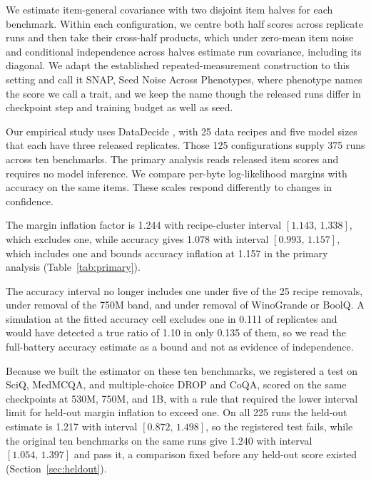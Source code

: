 \documentclass{article}
\newcommand{\ci}[2]{\ensuremath{[#1,\,#2]}}
\begin{document}
We estimate item-general covariance with two disjoint item halves for each benchmark. Within each configuration, we centre both half scores across replicate runs and then take their cross-half products, which under zero-mean item noise and conditional independence across halves estimate run covariance, including its diagonal. We adapt the established repeated-measurement construction to this setting and call it SNAP, Seed Noise Across Phenotypes, where phenotype names the score we call a trait, and we keep the name though the released runs differ in checkpoint step and training budget as well as seed.

Our empirical study uses DataDecide \citep{magnusson2025}, with 25 data recipes and five model sizes that each have three released replicates. Those 125 configurations supply 375 runs across ten benchmarks. The primary analysis reads released item scores and requires no model inference. We compare per-byte log-likelihood margins with accuracy on the same items. These scales respond differently to changes in confidence.

The margin inflation factor is 1.244 with recipe-cluster interval \ci{1.143}{1.338}, which excludes one, while accuracy gives 1.078 with interval \ci{0.993}{1.157}, which includes one and bounds accuracy inflation at 1.157 in the primary analysis (Table~\ref{tab:primary}).

The accuracy interval no longer includes one under five of the 25 recipe removals, under removal of the 750M band, and under removal of WinoGrande or BoolQ. A simulation at the fitted accuracy cell excludes one in 0.111 of replicates and would have detected a true ratio of 1.10 in only 0.135 of them, so we read the full-battery accuracy estimate as a bound and not as evidence of independence.

Because we built the estimator on these ten benchmarks, we registered a test on SciQ, MedMCQA, and multiple-choice DROP and CoQA, scored on the same checkpoints at 530M, 750M, and 1B, with a rule that required the lower interval limit for held-out margin inflation to exceed one. On all 225 runs the held-out estimate is 1.217 with interval \ci{0.872}{1.498}, so the registered test fails, while the original ten benchmarks on the same runs give 1.240 with interval \ci{1.054}{1.397} and pass it, a comparison fixed before any held-out score existed (Section~\ref{sec:heldout}).
\end{document}
